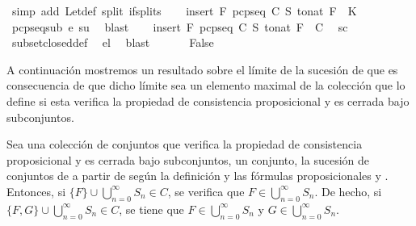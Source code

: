 \begin{isabellebody}
\ {\isacharparenleft}simp\ add{\isacharcolon}\ Let{\isacharunderscore}def\ split{\isacharcolon}\ if{\isacharunderscore}splits{\isacharparenright}\isanewline
\ \ \isamarkupfalse%
\ {\isachardoublequoteopen}insert\ F\ {\isacharparenleft}pcp{\isacharunderscore}seq\ C\ S\ {\isacharparenleft}to{\isacharunderscore}nat\ F{\isacharparenright}{\isacharparenright}\ {\isasymsubseteq}\ K{\isachardoublequoteclose}\ \isamarkupfalse%
\ pcp{\isacharunderscore}seq{\isacharunderscore}sub\ e\ su\ \isamarkupfalse%
\ blast\isanewline
\ \ \isamarkupfalse%
\ {\isachardoublequoteopen}insert\ F\ {\isacharparenleft}pcp{\isacharunderscore}seq\ C\ S\ {\isacharparenleft}to{\isacharunderscore}nat\ F{\isacharparenright}{\isacharparenright}\ {\isasymin}\ C{\isachardoublequoteclose}\ \isamarkupfalse%
\ sc\ \isanewline
\ \ \ \ \isamarkupfalse%
\ subset{\isacharunderscore}closed{\isacharunderscore}def\ \isamarkupfalse%
\ el\ \isamarkupfalse%
\ blast\isanewline
\ \ \isamarkupfalse%
\ {}\ \isamarkupfalse%
\ False\ \isacommand{{\isachardot}{\isachardot}}\isamarkupfalse%
\isanewline
{}\isamarkupfalse%
%
\endisatagproof
{\isafoldproof}%
%
\isadelimproof
%
\endisadelimproof
%
\begin{isamarkuptext}%
A continuación mostremos un resultado sobre el límite de la sucesión de  que es 
  consecuencia de que dicho límite sea un elemento maximal de la colección que lo define si esta
  verifica la propiedad de consistencia proposicional y es cerrada bajo subconjuntos.
  
  \begin{corolario}
    Sea  una colección de conjuntos que verifica la propiedad de consistencia proposicional y
    es cerrada bajo subconjuntos,  un conjunto,  la sucesión de conjuntos de  a partir 
    de  según la definición  y las fórmulas proposicionales  y . Entonces, si 
    $\{F\} \cup \bigcup_{n = 0}^{\infty} S_{n} \in C$, se verifica que 
    $F \in \bigcup_{n = 0}^{\infty} S_{n}$. De hecho, si 
    $\{F,G\} \cup \bigcup_{n = 0}^{\infty} S_{n} \in C$, se tiene que
    $F \in \bigcup_{n = 0}^{\infty} S_{n}$ y $G \in \bigcup_{n = 0}^{\infty} S_{n}$.
  \end{corolario}


\end{isamarkuptext}
\end{isabellebody}
